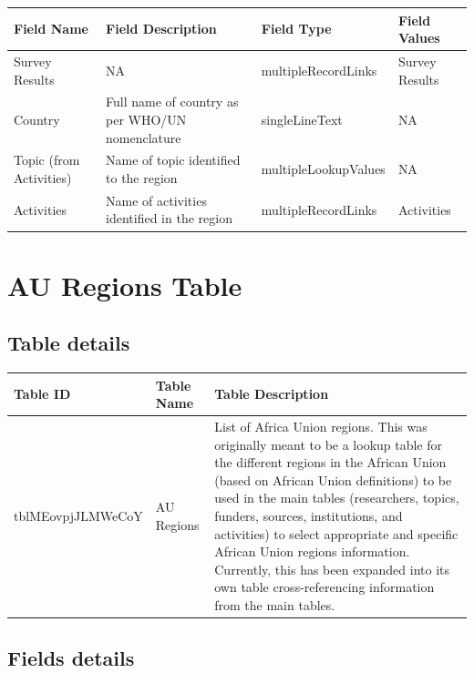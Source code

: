 \documentclass[
]{book}
\begin{document}
\begin{table}
\centering
\begin{tabular}{l|l|l|l}
\hline
\textbf{Field Name} & \textbf{Field Description} & \textbf{Field Type} & \textbf{Field Values}\\
\hline
Survey Results & NA & multipleRecordLinks & Survey Results\\
\hline
Country & Full name of country as per WHO/UN nomenclature & singleLineText & NA\\
\hline
Topic (from Activities) & Name of topic identified to the region & multipleLookupValues & NA\\
\hline
Activities & Name of activities identified in the region & multipleRecordLinks & Activities\\
\hline
\end{tabular}
\end{table}

\hypertarget{au-regions-table}{%
\section{AU Regions Table}\label{au-regions-table}}

\hypertarget{table-details-2}{%
\subsection{Table details}\label{table-details-2}}

\begin{table}
\centering
\begin{tabular}{l|l|l}
\hline
\textbf{Table ID} & \textbf{Table Name} & \textbf{Table Description}\\
\hline
tblMEovpjJLMWeCoY & AU Regions & List of Africa Union regions. This was originally meant to be a lookup table for the different regions in the African Union (based on African Union definitions) to be used in the main tables (researchers, topics, funders, sources, institutions, and activities) to select appropriate and specific African Union regions information. Currently, this has been expanded into its own table cross-referencing information from the main tables.\\
\hline
\end{tabular}
\end{table}

\hypertarget{fields-details-2}{%
\subsection{Fields details}\label{fields-details-2}}
\end{document}
